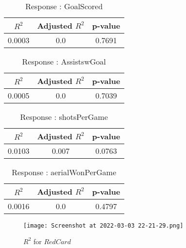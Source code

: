 \documentclass[12pt]{article}
\begin{document}
\begin{minipage}{0.5\textwidth}
	\begin{table}[H]
	\centering
	\caption{Response : GoalScored}\label{table:1a}
	{\begin{tabular}{|c|c|c|}
			\hline
			$ R^2 $ & Adjusted $ R^2 $ & p-value \\
			\hline
			0.0003 & 0.0 & 0.7691 \\
			\hline
		\end{tabular}
	}
\end{table}
\begin{table}[H]
	\centering
	\caption{Response : AssistswGoal}\label{table:1a}
	{\begin{tabular}{|c|c|c|}
			\hline
			$ R^2 $ & Adjusted $ R^2 $ & p-value \\
			\hline
			0.0005 & 0.0 & 0.7039 \\
			\hline
		\end{tabular}
	}
\end{table}

\end{minipage}
\hfill
\begin{minipage}{0.5\textwidth}
	\begin{table}[H]
	\centering
	\caption{Response : shotsPerGame }\label{table:1a}
	{\begin{tabular}{|c|c|c|}
			\hline
			$ R^2 $ & Adjusted $ R^2 $ & p-value \\
			\hline
			0.0103 & 0.007 & 0.0763 \\
			\hline
		\end{tabular}
	}
\end{table}
\begin{table}[H]
	\centering
	\caption{Response : aerialWonPerGame}\label{table:1a}
	{\begin{tabular}{|c|c|c|}
			\hline
			$ R^2 $ & Adjusted $ R^2 $ & p-value \\
			\hline
			0.0016 & 0.0 & 0.4797 \\
			\hline
		\end{tabular}
	}
\end{table}
\end{minipage}

\begin{figure}[H]
	\centering
	\texttt{[image: Screenshot at 2022-03-03 22-21-29.png]}
	\caption{$ R^2 $ for $ RedCard $}
	\label{fig:1}
\end{figure}
\end{document}
